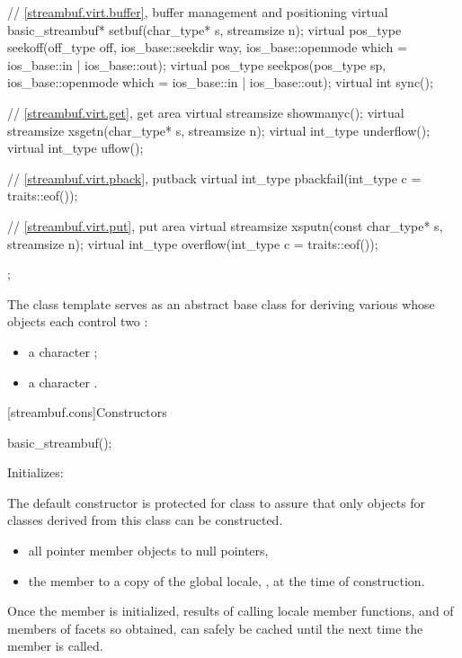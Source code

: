 \begin{codeblock}
{{    // \ref{streambuf.virt.buffer}, buffer management and positioning
    virtual basic_streambuf* setbuf(char_type* s, streamsize n);
    virtual pos_type seekoff(off_type off, ios_base::seekdir way,
                             ios_base::openmode which
                               = ios_base::in | ios_base::out);
    virtual pos_type seekpos(pos_type sp,
                             ios_base::openmode which
                               = ios_base::in | ios_base::out);
    virtual int      sync();

    // \ref{streambuf.virt.get}, get area
    virtual streamsize showmanyc();
    virtual streamsize xsgetn(char_type* s, streamsize n);
    virtual int_type   underflow();
    virtual int_type   uflow();

    // \ref{streambuf.virt.pback}, putback
    virtual int_type   pbackfail(int_type c = traits::eof());

    // \ref{streambuf.virt.put}, put area
    virtual streamsize xsputn(const char_type* s, streamsize n);
    virtual int_type   overflow(int_type c = traits::eof());
  };
}
\end{codeblock}

\pnum
The class template
serves as an abstract base class for deriving various
whose objects each control two
:
\begin{itemize}
\item
a character
;
\item
a character
.
\end{itemize}

[streambuf.cons]{Constructors}

%
\begin{itemdecl}
basic_streambuf();
\end{itemdecl}

\begin{itemdescr}
\pnum
\effects
Initializes:
\begin{footnote}
The default constructor is protected for class
to assure that only objects for classes
derived from this class can be constructed.
\end{footnote}
\begin{itemize}
\item
all pointer member objects to null pointers,
\item
the
member to a copy of the global locale,
,
at the time of construction.
\end{itemize}

\pnum
\remarks
Once the
member is initialized, results of calling locale member functions,
and of members of facets so obtained, can safely be cached until the
next time the member
is called.
\end{itemdescr}

